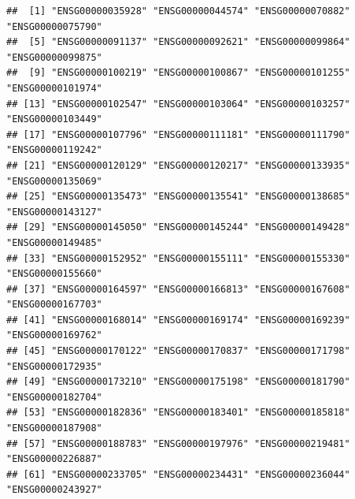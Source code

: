 \documentclass[ignorenonframetext,]{beamer}
\newenvironment{Shaded}{\begin{snugshade}}{\end{snugshade}}
\newcommand{\CommentTok}[1]{\textcolor[rgb]{0.56,0.35,0.01}{\textit{#1}}}
\newcommand{\DataTypeTok}[1]{\textcolor[rgb]{0.13,0.29,0.53}{#1}}
\newcommand{\DecValTok}[1]{\textcolor[rgb]{0.00,0.00,0.81}{#1}}
\newcommand{\FloatTok}[1]{\textcolor[rgb]{0.00,0.00,0.81}{#1}}
\newcommand{\KeywordTok}[1]{\textcolor[rgb]{0.13,0.29,0.53}{\textbf{#1}}}
\newcommand{\NormalTok}[1]{#1}
\newcommand{\OperatorTok}[1]{\textcolor[rgb]{0.81,0.36,0.00}{\textbf{#1}}}
\newcommand{\OtherTok}[1]{\textcolor[rgb]{0.56,0.35,0.01}{#1}}
\newcommand{\StringTok}[1]{\textcolor[rgb]{0.31,0.60,0.02}{#1}}
\begin{document}
\begin{frame}[fragile]

\begin{Shaded}
\end{Shaded}

\begin{verbatim}
##  [1] "ENSG00000035928" "ENSG00000044574" "ENSG00000070882" "ENSG00000075790"
##  [5] "ENSG00000091137" "ENSG00000092621" "ENSG00000099864" "ENSG00000099875"
##  [9] "ENSG00000100219" "ENSG00000100867" "ENSG00000101255" "ENSG00000101974"
## [13] "ENSG00000102547" "ENSG00000103064" "ENSG00000103257" "ENSG00000103449"
## [17] "ENSG00000107796" "ENSG00000111181" "ENSG00000111790" "ENSG00000119242"
## [21] "ENSG00000120129" "ENSG00000120217" "ENSG00000133935" "ENSG00000135069"
## [25] "ENSG00000135473" "ENSG00000135541" "ENSG00000138685" "ENSG00000143127"
## [29] "ENSG00000145050" "ENSG00000145244" "ENSG00000149428" "ENSG00000149485"
## [33] "ENSG00000152952" "ENSG00000155111" "ENSG00000155330" "ENSG00000155660"
## [37] "ENSG00000164597" "ENSG00000166813" "ENSG00000167608" "ENSG00000167703"
## [41] "ENSG00000168014" "ENSG00000169174" "ENSG00000169239" "ENSG00000169762"
## [45] "ENSG00000170122" "ENSG00000170837" "ENSG00000171798" "ENSG00000172935"
## [49] "ENSG00000173210" "ENSG00000175198" "ENSG00000181790" "ENSG00000182704"
## [53] "ENSG00000182836" "ENSG00000183401" "ENSG00000185818" "ENSG00000187908"
## [57] "ENSG00000188783" "ENSG00000197976" "ENSG00000219481" "ENSG00000226887"
## [61] "ENSG00000233705" "ENSG00000234431" "ENSG00000236044" "ENSG00000243927"
\end{verbatim}

\begin{Shaded}
\end{Shaded}
\end{frame}
\end{document}
